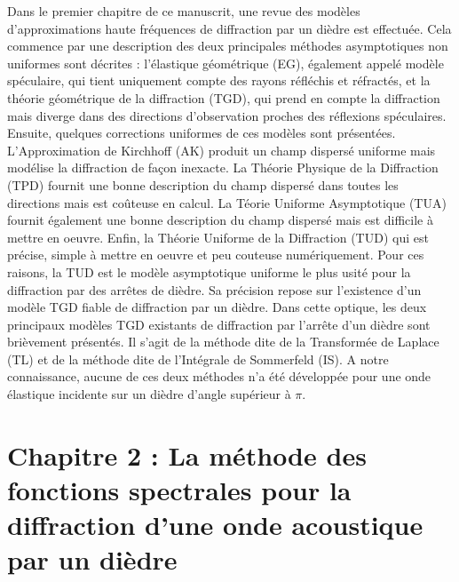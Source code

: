 Dans le premier chapitre de ce manuscrit, une revue des modèles d'approximations haute fréquences de diffraction par un dièdre est effectuée. Cela commence par une description des deux principales méthodes asymptotiques non uniformes sont décrites : l'élastique géométrique (EG), également appelé modèle spéculaire, qui tient uniquement compte des rayons réfléchis et réfractés, et la théorie géométrique de la diffraction (TGD), qui prend en compte la diffraction mais diverge dans des directions d'observation proches des réflexions spéculaires. Ensuite, quelques corrections uniformes de ces modèles sont présentées. L'Approximation de Kirchhoff (AK) produit un champ dispersé uniforme mais modélise la diffraction de façon inexacte. La Théorie Physique de la Diffraction (TPD) fournit une bonne description du champ dispersé dans toutes les directions mais est coûteuse en calcul. La Téorie Uniforme Asymptotique (TUA) fournit également une bonne description du champ dispersé mais est difficile à mettre en oeuvre. Enfin, la Théorie Uniforme de la Diffraction (TUD) qui est précise, simple à mettre en oeuvre et peu couteuse numériquement. Pour ces raisons, la TUD est le modèle asymptotique uniforme le plus usité pour la diffraction par des arrêtes de dièdre. Sa précision repose sur l'existence d'un modèle TGD fiable de diffraction par un dièdre. Dans cette optique, les deux principaux modèles TGD existants de diffraction par l'arrête d'un dièdre sont brièvement présentés. Il s'agit de la méthode dite de la Transformée de Laplace (TL) et de la méthode dite de l'Intégrale de Sommerfeld (IS). A notre connaissance, aucune de ces deux méthodes n'a été développée pour une onde élastique incidente sur un dièdre d'angle supérieur à $\pi$.

\section[Chapitre 2]{Chapitre 2 : La méthode des fonctions spectrales pour la diffraction d'une onde acoustique par un dièdre}

